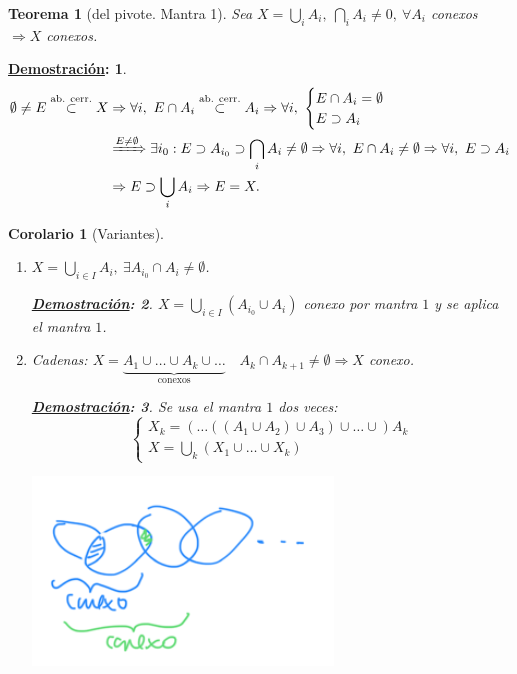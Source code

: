 \documentclass[10pt,a4paper,openright]{book}
\theoremstyle{break}
\newtheorem*{theo}{Teorema}
\newtheorem*{coro}{Corolario}
\newtheorem*{demo}{\underline{Demostración}:}
\begin{document}
\begin{theo}[del pivote. Mantra 1] 
Sea $X = \bigcup_{i} A_i,\ \bigcap_{i} A_i \neq 0,\ \forall A_i$ conexos $\Rightarrow X$ conexos.
\end{theo}
\begin{demo}
\begin{align*}
    \emptyset \neq E \stackrel{\text{ab. cerr.}}{\subset} X &\Rightarrow \forall i,\ E \cap A_i \stackrel{\text{ab. cerr.}}{\subset} A_i \Rightarrow \forall i,\ \begin{cases}
        E \cap A_i = \emptyset\\
        E \supset A_i
    \end{cases}\\
    &\xRightarrow{E \neq \emptyset} \exists i_0: E \supset A_{i_0} \supset \bigcap_{i} A_i \neq \emptyset \Rightarrow \forall i,\ E \cap A_i \neq \emptyset \Rightarrow \forall i,\ E \supset A_i\\
    &\Rightarrow E \supset \bigcup_{i} A_i \Rightarrow E = X
.\end{align*}
\end{demo}

\begin{coro}[Variantes]
\begin{enumerate}
    \item $X = \bigcup_{i \in  I} A_i,\ \exists A_{i_0} \cap A_i \neq \emptyset$.
    \begin{demo}
        $X = \bigcup_{i \in  I}\left( A_{i_0} \cup A_i \right)$ conexo por mantra $1$ y se aplica el mantra $1$.
    \end{demo}
    \item Cadenas: $X = \underbrace{A_1 \cup \ldots \cup A_k \cup \ldots}_{\text{conexos}}\quad A_k \cap A_{k + 1} \neq \emptyset \Rightarrow X$ conexo.
    \begin{demo}
        Se usa el mantra $1$ dos veces:
        \[
        \begin{cases}
            X_k = \left( \ldots \left( \left( A_1 \cup A_2 \right) \cup A_3 \right) \cup \ldots \cup \right) A_k\\
            X = \bigcup_{k} \left( X_1 \cup \ldots \cup X_k \right) 
        \end{cases} 
        \]
        \begin{center}
            \includegraphics[scale=0.3]{images/dem_var_mantra_1_conx} 
        \end{center}
    \end{demo}
\end{enumerate} 
\end{coro}
\end{document}
